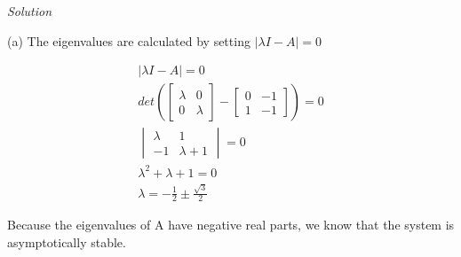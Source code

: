\documentclass{article}
\begin{document}
  \noindent \textit{Solution} \newline \newline

  (a) The eigenvalues are calculated by setting $|\lambda I-A|=0$

  \begin{align*}
    |\lambda I-A|=0 \\
    det(\begin{bmatrix}
      \lambda & 0 \\
      0 & \lambda
    \end{bmatrix} -
    \begin{bmatrix}
      0 & -1 \\
      1 & -1
    \end{bmatrix}) = 0 \\
    \begin{vmatrix}
      \lambda & 1 \\
      -1 & \lambda + 1
    \end{vmatrix} = 0 \\
    \lambda^2 + \lambda + 1 = 0 \\
    \lambda = -\frac{1}{2} \pm \frac{\sqrt{3}}{2}
  \end{align*}

  Because the eigenvalues of A have negative real parts, we know that the system
  is asymptotically stable. \newline \newline
\end{document}
